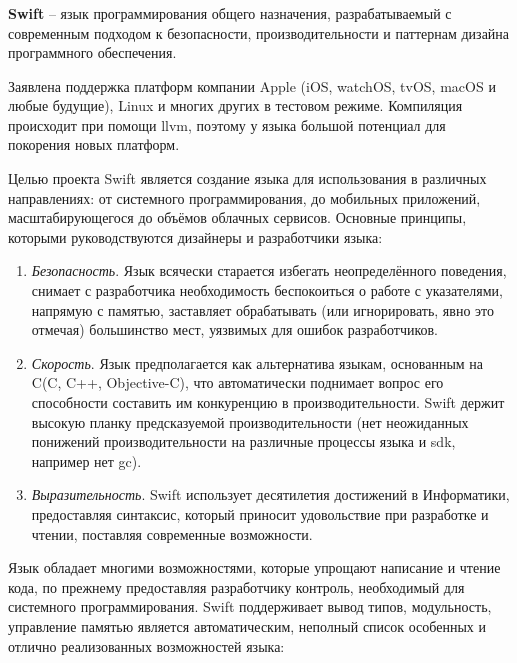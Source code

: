 \subsubsection{}
\label{sec:development:arch:ios:swift}

\textbf{Swift} -- язык программирования общего назначения, разрабатываемый с современным подходом к безопасности, производительности и паттернам дизайна программного обеспечения\cite{swift:about}. 

Заявлена поддержка платформ компании Apple (iOS, watchOS, tvOS, macOS и любые будущие), Linux и многих других в тестовом режиме. Компиляция происходит при помощи \gls{llvm}, поэтому у языка большой потенциал для покорения новых платформ.

Целью проекта Swift является создание языка для использования в различных направлениях: от системного программирования, до мобильных приложений, масштабирующегося до объёмов облачных сервисов. Основные принципы, которыми руководствуются дизайнеры и разработчики языка:

\begin{enumerate}
	\item \emph{Безопасность}. Язык всячески старается избегать неопределённого поведения, снимает с разработчика необходимость беспокоиться о работе с указателями, напрямую с памятью, заставляет обрабатывать (или игнорировать, явно это отмечая) большинство мест, уязвимых для ошибок разработчиков.
	\item \emph{Скорость}. Язык предполагается как альтернатива языкам, основанным на C(C, C++, Objective-C), что автоматически поднимает вопрос его способности составить им конкуренцию в производительности. Swift держит высокую планку предсказуемой производительности (нет неожиданных понижений производительности на различные процессы языка и \gls{sdk}, например нет \gls{gc}).
	\item \emph{Выразительность}. Swift использует десятилетия достижений в Информатики, предоставляя синтаксис, который приносит удовольствие при разработке и чтении, поставляя современные возможности.  
\end{enumerate}

Язык обладает многими возможностями, которые упрощают написание и чтение кода, по прежнему предоставляя разработчику контроль, необходимый для системного программирования. Swift поддерживает вывод типов, модульность, управление памятью является автоматическим, неполный список особенных и отлично реализованных возможностей языка:

